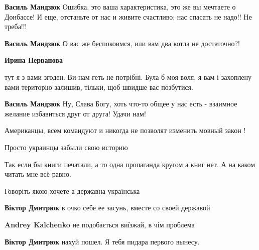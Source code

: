 \begin{itemize}
\begin{itemize}
\textbf{Василь Мандзюк} Ошибка, это ваша характеристика, это же вы мечтаете о
Донбассе! И еще, отстаньте от нас и живите счастливо; нас спасать не надо!! Не
треба!!!

\textbf{Василь Мандзюк} О вас же беспокоимся, или вам два котла не достаточно?!

\textbf{Ирина Перванова} 

тут я з вами згоден. Ви нам геть не потрібні. Була б моя воля, я вам і
захоплену вами територію залишив, тільки, щоб швидше вас позбутися.


\textbf{Василь Мандзюк} Ну, Слава Богу, хоть что-то общее у нас есть - взаимное желание избавиться друг от друга! Удачи нам!

\end{itemize}

Американцы, всем командуют и никогда не позволят изменить мовный закон !

Просто украинцы забыли свою историю

Так если бы книги печатали, а то одна пропаганда кругом а книг нет. А на каком читать мне всё равно.

Говоріть якою хочете а державна українська

\begin{itemize}
\textbf{Віктор Дмитрюк} в очко себе ее засунь, вместе со своей державой

\textbf{Andrey Kalchenko} не подобається виїзжай, в чім проблема

\textbf{Віктор Дмитрюк} нахуй пошел. Я тебя пидара первого вынесу.


\end{itemize}
\end{itemize}

